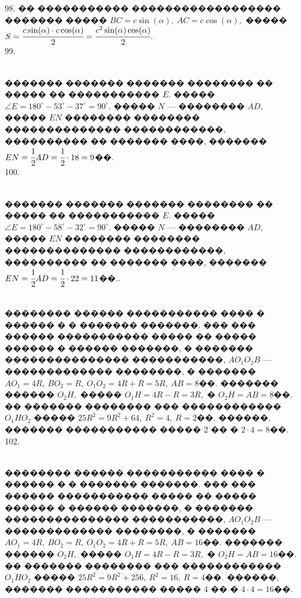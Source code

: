 \documentclass[12pt]{article}
\begin{document}
98. �� ����������� ������������������ ������� ����� $BC=c\sin(\alpha),\ AC=c\cos(\alpha),$ ����� $S=\cfrac{c\sin(\alpha)\cdot c\cos(\alpha)}{2}=\cfrac{c^2\sin(\alpha)\cos(\alpha)}{2}.$\\
99. \begin{figure}[ht!]
\end{figure}\\
������� ������� ������� �������� �� ����� �� ����������� $E.$ ����� $\angle E=180^\circ-53^\circ-37^\circ=90^\circ.$ ����� $N$ --- �������� $AD,$ ����� $EN$ �������� �������� �������������� ������������, ���������� �� ������� ����, ������� $EN=\cfrac{1}{2}AD=\cfrac{1}{2}\cdot18=9$��.\\
100. \begin{figure}[ht!]
\end{figure}\\
������� ������� ������� �������� �� ����� �� ����������� $E.$ ����� $\angle E=180^\circ-58^\circ-32^\circ=90^\circ.$ ����� $N$ --- �������� $AD,$ ����� $EN$ �������� �������� �������������� ������������, ���������� �� ������� ����, ������� $EN=\cfrac{1}{2}AD=\cfrac{1}{2}\cdot22=11$��.\newpage{}. \begin{figure}[ht!]
\end{figure}\\
�������� ������ ����������� ���� � ������ � � ������� �������. ��� ��� ������ ����������� ����� �� ����� ������ � ������ �������, � ������� ��������������� �����������, $AO_1O_2B$ --- ������������� ��������, � ������� $AO_1=4R,\ BO_2=R,\ O_1O_2=4R+R=5R,\ AB=8$��. ������� ������ $O_2H,$ ����� $O_1H=4R-R=3R,$ � $O_2H=AB=8$��. �� ������� �������� ��� ������������ $O_1HO_2$ ����� $25R^2=9R^2+64,\ R^2=4,\ R=2$��. ������, ������� ����������� ����� 2 �� � $2\cdot4=8$��.\\
102. \begin{figure}[ht!]
\end{figure}\\
�������� ������ ����������� ���� � ������ � � ������� �������. ��� ��� ������ ����������� ����� �� ����� ������ � ������ �������, � ������� ��������������� �����������, $AO_1O_2B$ --- ������������� ��������, � ������� $AO_1=4R,\ BO_2=R,\ O_1O_2=4R+R=5R,\ AB=16$��. ������� ������ $O_2H,$ ����� $O_1H=4R-R=3R,$ � $O_2H=AB=16$��. �� ������� �������� ��� ������������ $O_1HO_2$ ����� $25R^2=9R^2+256,\ R^2=16,\ R=4$��. ������, ������� ����������� ����� 4 �� � $4\cdot4=16$��.\\
\end{document}
